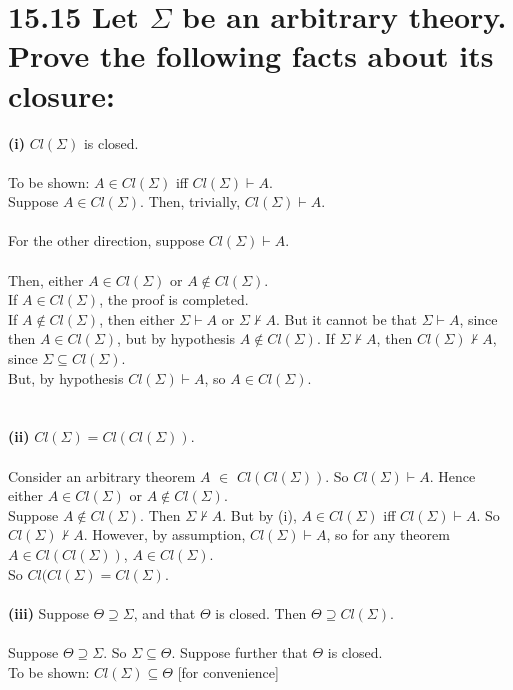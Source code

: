 \documentclass{article}
\begin{document}
\section*{15.15 Let $\Sigma$ be an arbitrary theory. Prove the following facts
about its closure:}
\textbf{(i)} $Cl(\Sigma)$ is closed.\\\\
To be shown: $A \in Cl(\Sigma)$ iff $Cl(\Sigma) \vdash A$.\\ Suppose $A \in Cl(\Sigma)$. Then, trivially, $Cl(\Sigma) \vdash A$.\\\\
For the other direction, suppose $Cl(\Sigma) \vdash A$.\\\\ Then, either $A \in Cl(\Sigma)$ or $A \notin Cl(\Sigma)$.\\ If $A \in Cl(\Sigma)$, the proof is completed.\\ If  $A \notin Cl(\Sigma)$, then either $\Sigma \vdash A$ or $\Sigma \nvdash A$. But it cannot be that $\Sigma \vdash A$, since then $A \in Cl(\Sigma)$, but by hypothesis $A \notin Cl(\Sigma)$. If $\Sigma \nvdash A$, then   $Cl(\Sigma) \nvdash A$, since $\Sigma \subseteq Cl(\Sigma)$.\\ But, by hypothesis $Cl(\Sigma) \vdash A$, so $A \in Cl(\Sigma)$.
\\\\
\\
\textbf{(ii)} $Cl(\Sigma) = Cl(Cl(\Sigma))$.\\\\
Consider an arbitrary theorem $A$ $\in$ $Cl(Cl(\Sigma))$. So $Cl(\Sigma) \vdash A$. Hence either $A \in Cl(\Sigma)$ or $A \notin Cl(\Sigma)$. \\ 
Suppose $A \notin Cl(\Sigma)$. Then $\Sigma \nvdash A$. But by (i), $A \in Cl(\Sigma)$ iff $Cl(\Sigma) \vdash A$. So $Cl(\Sigma) \nvdash A$. However, by assumption, $Cl(\Sigma) \vdash A$, so for any theorem $A \in Cl(Cl(\Sigma))$, $A \in Cl(\Sigma)$.\\
So $Cl(Cl(\Sigma) = Cl(\Sigma)$.
\\
\\
\textbf{(iii)} Suppose $\Theta \supseteq 
\Sigma$, and that $\Theta$ is closed. Then $\Theta \supseteq 
Cl(\Sigma)$.\\\\
Suppose $\Theta \supseteq 
\Sigma$. So $\Sigma \subseteq \Theta$. Suppose further that $\Theta$ is closed.\\
To be shown: $Cl(\Sigma) \subseteq \Theta$ [for convenience]\\\\
\end{document}
